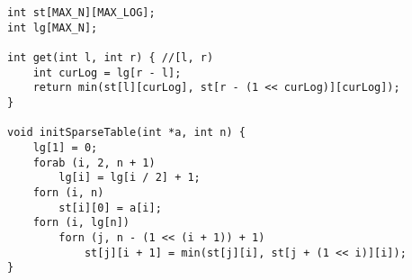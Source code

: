 \begin{verbatim}
int st[MAX_N][MAX_LOG];
int lg[MAX_N];

int get(int l, int r) { //[l, r)
	int curLog = lg[r - l];
	return min(st[l][curLog], st[r - (1 << curLog)][curLog]);
}

void initSparseTable(int *a, int n) {
	lg[1] = 0;
	forab (i, 2, n + 1)
		lg[i] = lg[i / 2] + 1;
	forn (i, n)
		st[i][0] = a[i];
	forn (i, lg[n])
		forn (j, n - (1 << (i + 1)) + 1)
			st[j][i + 1] = min(st[j][i], st[j + (1 << i)][i]);
}
\end{verbatim}
